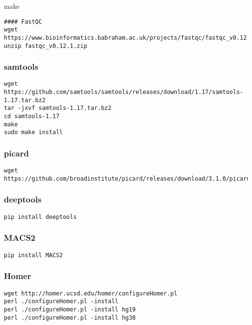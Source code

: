 \documentclass[
]{book}
\begin{document}
make

\begin{verbatim}
#### FastQC
wget https://www.bioinformatics.babraham.ac.uk/projects/fastqc/fastqc_v0.12.1.zip
unzip fastqc_v0.12.1.zip
\end{verbatim}

\subsubsection{samtools}\label{samtools}

\begin{verbatim}
wget https://github.com/samtools/samtools/releases/download/1.17/samtools-1.17.tar.bz2
tar -jxvf samtools-1.17.tar.bz2
cd samtools-1.17
make
sudo make install
\end{verbatim}

\subsubsection{picard}\label{picard}

\begin{verbatim}
wget https://github.com/broadinstitute/picard/releases/download/3.1.0/picard.jar
\end{verbatim}

\subsubsection{deeptools}\label{deeptools}

\begin{verbatim}
pip install deeptools
\end{verbatim}

\subsubsection{MACS2}\label{macs2}

\begin{verbatim}
pip install MACS2
\end{verbatim}

\subsubsection{Homer}\label{homer}

\begin{verbatim}
wget http://homer.ucsd.edu/homer/configureHomer.pl
perl ./configureHomer.pl -install
perl ./configureHomer.pl -install hg19
perl ./configureHomer.pl -install hg38
\end{verbatim}
\end{document}
